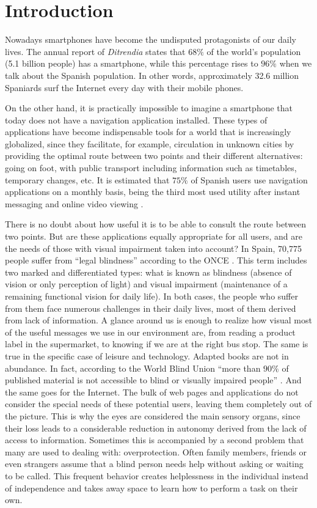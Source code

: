 \chapter{Introduction}
\label{cap:introduction}

Nowadays smartphones have become the undisputed protagonists of our daily lives. The annual report of \textit{Ditrendia} \citep{ditrendia2019informe} states that $68\%$ of the world's population (5.1 billion people) has a smartphone, while this percentage rises to $96\%$ when we talk about the Spanish population. In other words, approximately 32.6 million Spaniards surf the Internet every day with their mobile phones. 

On the other hand, it is practically impossible to imagine a smartphone that today does not have a navigation application installed. These types of applications have become indispensable tools for a world that is increasingly globalized, since they facilitate, for example, circulation in unknown cities by providing the optimal route between two points and their different alternatives: going on foot, with public transport including information such as timetables, temporary changes, etc. It is estimated that $75\%$ of Spanish users use navigation applications on a monthly basis, being the third most used utility after instant messaging and online video viewing \citep{ditrendia2019informe}.

There is no doubt about how useful it is to be able to consult the route between two points. But are these applications equally appropriate for all users, and are the needs of those with visual impairment taken into account? In Spain, 70,775 people suffer from ``legal blindness'' according to the ONCE \citep{informeceguera}. This term includes two marked and differentiated types: what is known as blindness (absence of vision or only perception of light) and visual impairment (maintenance of a remaining functional vision for daily life). In both cases, the people who suffer from them face numerous challenges in their daily lives, most of them derived from lack of information. A glance around us is enough to realize how visual most of the useful messages we use in our environment are, from reading a product label in the supermarket, to knowing if we are at the right bus stop. The same is true in the specific case of leisure and technology. Adapted books are not in abundance. In fact, according to the World Blind Union ``more than $90\%$ of published material is not accessible to blind or visually impaired people'' \citep{envision}. And the same goes for the Internet. The bulk of web pages and applications do not consider the special needs of these potential users, leaving them completely out of the picture. This is why the eyes are considered the main sensory organs, since their loss leads to a considerable reduction in autonomy derived from the lack of access to information. Sometimes this is accompanied by a second problem that many are used to dealing with: overprotection. Often family members, friends or even strangers assume that a blind person needs help without asking or waiting to be called. This frequent behavior creates helplessness in the individual instead of independence and takes away space to learn how to perform a task on their own. 

